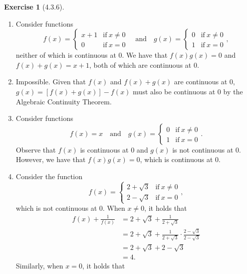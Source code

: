 \documentclass{amsart}
\theoremstyle{definition}
\newtheorem{exercise}{Exercise}
\begin{document}
\begin{exercise}[4.3.6]
  \begin{enumerate}[label={(\alph*)}]
    \item Consider functions
      \[
        f(x) =
        \begin{cases}
          x + 1 & \text{if}\ x \neq 0 \\
          0 & \text{if}\ x = 0
        \end{cases}
        \quad \text{and} \quad
        g(x) =
        \begin{cases}
          0 & \text{if}\ x \neq 0 \\
          1 & \text{if}\ x = 0
        \end{cases},
      \]
      neither of which is continuous at 0.
      We have that $f(x) g(x) = 0$ and $f(x) + g(x) = x + 1$, both of which are
      continuous at 0.
    \item Impossible. Given that $f(x)$ and $f(x) + g(x)$ are continuous at
      0, $g(x) = [f(x) + g(x)] - f(x)$ must also be continuous at 0 by the
      Algebraic Continuity Theorem.
    \item Consider functions
      \[
        f(x) = x
        \quad \text{and} \quad
        g(x) =
        \begin{cases}
          0 & \text{if}\ x \neq 0 \\
          1 & \text{if}\ x = 0
        \end{cases}.
      \]
      Observe that $f(x)$ is continuous at 0 and $g(x)$ is not continuous at 0.
      However, we have that $f(x) g(x) = 0$, which is continuous at 0.
    \item Consider the function
      \[
        f(x) =
        \begin{cases}
          2 + \sqrt{3} & \text{if}\ x \neq 0 \\
          2 - \sqrt{3} & \text{if}\ x = 0
        \end{cases},
      \]
      which is not continuous at 0. When $x \neq 0$, it holds that
      \begin{align*}
        f(x) + \frac{1}{f(x)} &= 2 + \sqrt{3} + \frac{1}{2 + \sqrt{3}} \\
        &= 2 + \sqrt{3} + \frac{1}{2 + \sqrt{3}} \cdot \frac{2 - \sqrt{3}}{2 -
        \sqrt{3}} \\
        &= 2 + \sqrt{3} + 2 - \sqrt{3} \\
        &= 4.
      \end{align*}
      Similarly, when $x = 0$, it holds that

\end{enumerate}
\end{exercise}
\end{document}
